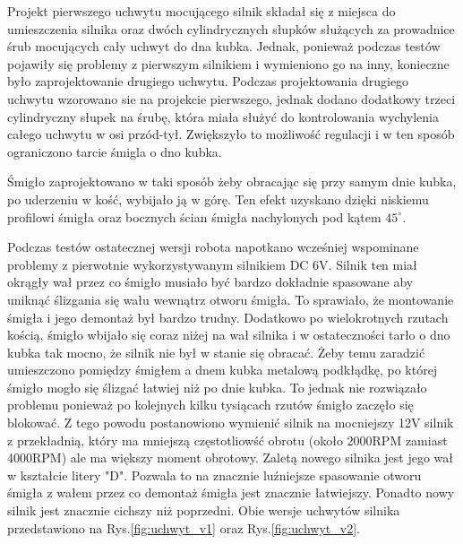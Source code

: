Projekt pierwszego uchwytu mocującego silnik składał się z miejsca do umieszczenia silnika oraz dwóch cylindrycznych słupków służących za prowadnice
śrub mocujących cały uchwyt do dna kubka. Jednak, ponieważ podczas testów pojawiły się problemy z pierwszym silnikiem i wymieniono go na inny, konieczne
było zaprojektowanie drugiego uchwytu. Podczas projektowania drugiego uchwytu wzorowano sie na projekcie pierwszego, jednak dodano dodatkowy trzeci
cylindryczny słupek na śrubę, która miała służyć do kontrolowania wychylenia całego uchwytu w osi przód-tył. Zwiększyło to możliwość regulacji i w ten sposób
ograniczono tarcie śmigla o dno kubka. 

Śmigło zaprojektowano w taki sposób żeby obracając się przy samym dnie kubka, po uderzeniu w kość, wybijało ją w górę. Ten efekt uzyskano
dzięki niskiemu profilowi śmigła oraz bocznych ścian śmigła nachylonych pod kątem $45^{\circ}$.

Podczas testów ostatecznej wersji robota napotkano wcześniej wspominane problemy z pierwotnie wykorzystywanym silnikiem DC 6V. Silnik ten miał okrągły wał przez co śmigło musiało
być bardzo dokładnie spasowane aby uniknąć ślizgania się wału wewnątrz otworu śmigła. To sprawiało, że montowanie śmigła i jego demontaż był bardzo trudny. Dodatkowo po wielokrotnych rzutach kością, śmigło
wbijało się coraz niżej na wał silnika i w ostateczności tarło o dno kubka tak mocno, że silnik nie był w stanie się obracać. 
Żeby temu zaradzić umieszczono pomiędzy śmigłem a dnem kubka metalową podkłądkę, po której śmigło mogło się ślizgać łatwiej niż po dnie kubka. To
jednak nie rozwiązało problemu ponieważ po kolejnych kilku tysiącach rzutów śmigło zaczęło się blokować. 
Z tego powodu postanowiono wymienić silnik na mocniejszy 12V silnik z przekładnią, który ma mniejszą częstotliowść obrotu (około 2000RPM zamiast 4000RPM) ale ma większy moment obrotowy.
Zaletą nowego silnika jest jego wał w kształcie litery "D". Pozwala to na znacznie luźniejsze spasowanie otworu śmigła z wałem przez co 
demontaż śmigła jest znacznie łatwiejszy. Ponadto nowy silnik jest znacznie cichszy niż poprzedni. Obie wersje uchwytów silnika przedstawiono na Rys.\ref{fig:uchwyt_v1} oraz Rys.\ref{fig:uchwyt_v2}.

